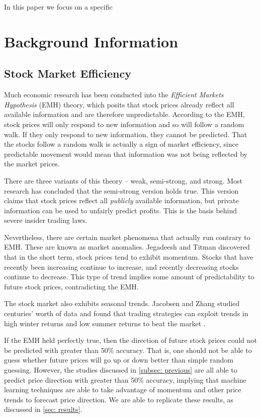\documentclass[pageno]{jpaper}
\begin{document}
In this paper we focus on a specific 

\section{Background Information}
\subsection{Stock Market Efficiency}
\label{subsec: stock}
Much economic research has been conducted into the {\em Efficient Markets Hypothesis} (EMH) theory, which posits that stock prices already reflect all available information \cite{bodie} and are therefore unpredictable. According to the EMH, stock prices will only respond to new information and so will follow a random walk. If they only respond to new information, they cannot be predicted. That the stocks follow a random walk is actually a sign of market efficiency, since predictable movement would mean that information was not being reflected by the market prices.

There are three variants of this theory -- weak, semi-strong, and strong. Most research has concluded that the semi-strong version holds true. This version claims that stock prices reflect all {\em publicly} available information, but private information can be used to unfairly predict profits. This is the basis behind severe insider trading laws.

Nevertheless, there are certain market phenomena that actually run contrary to EMH. These are known as market anomalies. Jegadeesh and Titman discovered that in the short term, stock prices tend to exhibit momentum\cite{jegadeesh}. Stocks that have recently been increasing continue to increase, and recently decreasing stocks continue to decrease. This type of trend implies some amount of predictability to future stock prices, contradicting the EMH. 

The stock market also exhibits seasonal trends. Jacobsen and Zhang studied centuries' worth of data and found that trading strategies can exploit trends in high winter returns and low summer returns to beat the market \cite{jacobsen2}\cite{jacobsen1}.

If the EMH held perfectly true, then the direction of future stock prices could not be predicted with greater than 50\% accuracy. That is, one should not be able to guess whether future prices will go up or down better than simple random guessing. However, the studies discussed in \ref{subsec: previous} are all able to predict price direction with greater than 50\% accuracy, implying that machine learning techniques are able to take advantage of momentum and other price trends to forecast price direction. We are able to replicate these results, as discussed in \ref{sec: results}.
\end{document}
